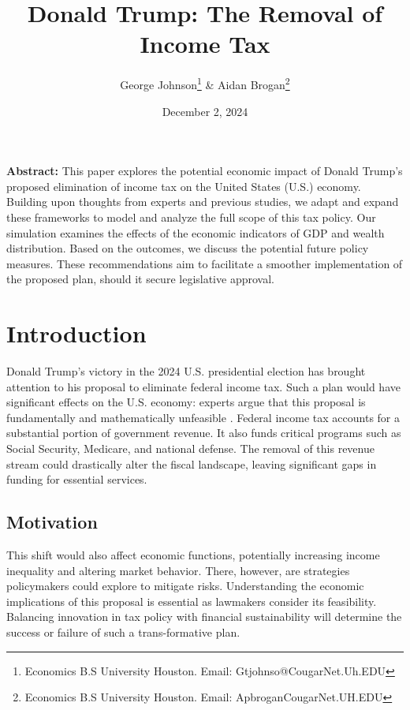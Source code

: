 \documentclass[12pt,letterpaper]{article}
\begin{document}
\title{\textbf{Donald Trump: The Removal of Income Tax}}
\author{George Johnson\footnote{Economics B.S University Houston. Email: Gtjohnso@CougarNet.Uh.EDU} \& Aidan Brogan\footnote{Economics B.S University Houston. Email: ApbroganCougarNet.UH.EDU}}
\date{December 2, 2024}
\maketitle

\textbf{Abstract:} This paper explores the potential economic impact of Donald Trump's proposed elimination of income tax on the United States (U.S.) economy. Building upon thoughts from experts and previous studies, we adapt and expand these frameworks to model and analyze the full scope of this tax policy. Our simulation examines the effects of the economic indicators of GDP and wealth distribution. Based on the outcomes, we discuss the potential future policy measures. These recommendations aim to facilitate a smoother implementation of the proposed plan, should it secure legislative approval.

\newpage
\section{Introduction}

 \indent Donald Trump's victory in the 2024 U.S. presidential election has brought attention to his proposal to eliminate federal income tax. Such a plan would have significant effects on the U.S. economy: experts argue that this proposal is fundamentally and mathematically unfeasible \citep{Max_Zahn}. Federal income tax accounts for a substantial portion of government revenue. It also funds critical programs such as Social Security, Medicare, and national defense. The removal of this revenue stream could drastically alter the fiscal landscape, leaving significant gaps in funding for essential services.
 
\subsection*{Motivation}

 \indent This shift would also affect economic functions, potentially increasing income inequality and altering market behavior. There, however, are strategies policymakers could explore to mitigate risks. Understanding the economic implications of this proposal is essential as lawmakers consider its feasibility. Balancing innovation in tax policy with financial sustainability will determine the success or failure of such a trans-formative plan.
\end{document}
